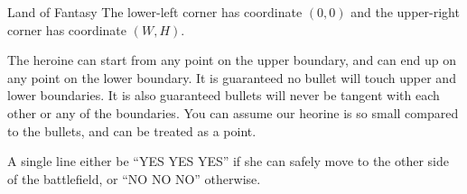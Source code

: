 \begin{problem}{Land of Fantasy}
The lower-left corner has coordinate $(0, 0)$ and the upper-right corner
has coordinate $(W, H)$.

The heroine can start from any point on the upper boundary, and can end up on 
any  point on the lower boundary.
It is guaranteed no bullet will touch upper and lower boundaries.
It is also guaranteed bullets will never be tangent with each other or any of
the boundaries.
You can assume our heorine is so small compared to the bullets, and can be
treated as a point.

\OutputFile

A single line either be ``YES YES YES'' if she can safely move to the other side
of the battlefield, or ``NO NO NO'' otherwise.

\Examples

\begin{example}
%
%
\end{example}
\end{problem}
